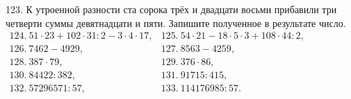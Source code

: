 123. К утроенной разности ста сорока трёх и двадцати восьми прибавили три четверти суммы девятнадцати и пяти. Запишите полученное в результате число.\\
$\begin{array}{lll}
124.\ 51 \cdot 23 + 102 \cdot 31 : 2 - 3 \cdot 4 \cdot 17,& 125.\ 54 \cdot 21 - 18 \cdot 5 \cdot 3 + 108 \cdot 44 : 2,\\
126.\ 7462-4929,& 127.\ 8563-4259,\\
128.\ 387\cdot79,& 129.\ 376\cdot86,\\
130.\ 84422:382,& 131.\ 91715:415,\\
132.\ 57296571 : 57, & 133.\ 114176985 : 57.
\end{array}$
\newpage

